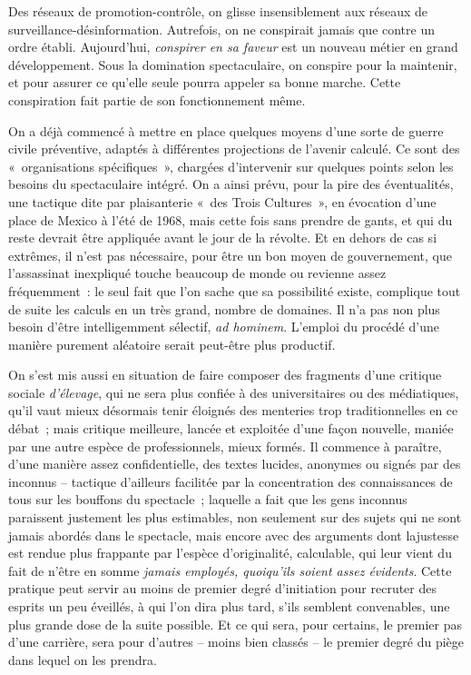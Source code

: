 \documentclass[french,twoside]{book} %
\begin{document}
\noindent Des réseaux de promotion-contrôle, on glisse insensiblement aux réseaux de surveillance-désinformation. Autrefois, on ne conspirait jamais que contre un ordre établi. Aujourd’hui, \emph{conspirer en sa faveur} est un nouveau métier en grand développement. Sous la domination spectaculaire, on conspire pour la maintenir, et pour assurer ce qu’elle seule pourra appeler sa bonne marche. Cette conspiration fait partie de son fonctionnement même.\par
On a déjà commencé à mettre en place quelques moyens d’une sorte de guerre civile préventive, adaptés à différentes projections de l’avenir calculé. Ce sont des « organisations spécifiques », chargées d’intervenir sur quelques points selon les besoins du spectaculaire intégré. On a ainsi prévu, pour la pire des éventualités, une tactique dite par plaisanterie « des Trois Cultures », en évocation d’une place de Mexico à l’été de 1968, mais cette fois sans prendre de gants, et qui du reste devrait être appliquée avant le jour de la révolte. Et en dehors de cas si extrêmes, il n’est pas nécessaire, pour être un bon moyen de gouvernement, que l’assassinat inexpliqué touche beaucoup de monde ou revienne assez fréquemment : le seul fait que l’on sache que sa possibilité existe, complique tout de suite les calculs en un très grand, nombre de domaines. Il n’a pas non plus besoin d’être intelligemment sélectif, \emph{ad hominem}. L’emploi du procédé d’une manière purement aléatoire serait peut-être plus productif.\par
On s’est mis aussi en situation de faire composer des fragments d’une critique sociale \emph{d’élevage}, qui ne sera plus confiée à des universitaires ou des médiatiques, qu’il vaut mieux désormais tenir éloignés des menteries trop traditionnelles en ce débat ; mais critique meilleure, lancée et exploitée d’une façon nouvelle, maniée par une autre espèce de professionnels, mieux formés. Il commence à paraître, d’une manière assez confidentielle, des textes lucides, anonymes ou signés par des inconnus – tactique d’ailleurs facilitée par la concentration des connaissances de tous sur les bouffons du spectacle ; laquelle a fait que les gens inconnus paraissent justement les plus estimables, non seulement sur des sujets qui ne sont jamais abordés dans le spectacle, mais encore avec des arguments dont lajustesse est rendue plus frappante par l’espèce d’originalité, calculable, qui leur vient du fait de n’être en somme \emph{jamais employés, quoiqu’ils soient assez évidents}. Cette pratique peut servir au moins de premier degré d’initiation pour recruter des esprits un peu éveillés, à qui l’on dira plus tard, s’ils semblent convenables, une plus grande dose de la suite possible. Et ce qui sera, pour certains, le premier pas d’une carrière, sera pour d’autres – moins bien classés – le premier degré du piège dans lequel on les prendra.\par
\end{document}
